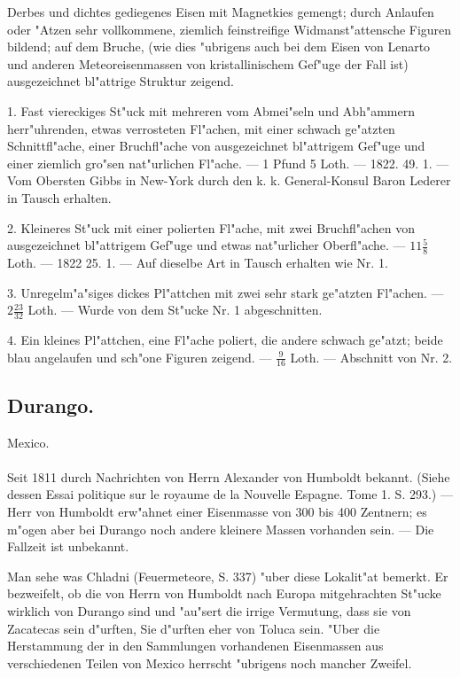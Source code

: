 \documentclass[a4paper, 11pt, oneside, polutonikogreek, german]{article}
\begin{document}
\setlength{\leftskip}{0pt}
\setlength{\parindent}{20pt}

Derbes und dichtes gediegenes Eisen mit Magnetkies gemengt; durch Anlaufen oder "Atzen sehr vollkommene, ziemlich feinstreifige Widmanst"attensche Figuren bildend; auf dem Bruche, (wie dies "ubrigens auch bei dem Eisen von Lenarto und anderen Meteoreisenmassen von kristallinischem Gef"uge der Fall ist) ausgezeichnet bl"attrige Struktur zeigend.

1. Fast viereckiges St"uck mit mehreren vom Abmei"seln und Abh"ammern herr"uhrenden, etwas verrosteten Fl"achen, mit einer schwach ge"atzten Schnittfl"ache, einer Bruchfl"ache von ausgezeichnet bl"attrigem Gef"uge und einer ziemlich gro"sen nat"urlichen Fl"ache. --- 1 Pfund 5 Loth. --- 1822. 49. 1. --- Vom Obersten Gibbs in New-York durch den k. k. General-Konsul Baron Lederer in Tausch erhalten.

2. Kleineres St"uck mit einer polierten Fl"ache, mit zwei Bruchfl"achen von ausgezeichnet bl"attrigem Gef"uge und etwas nat"urlicher Oberfl"ache. --- $11\frac{5}{8}$ Loth. --- 1822 25. 1. --- Auf dieselbe Art in Tausch erhalten wie Nr. 1.

3. Unregelm"a"siges dickes Pl"attchen mit zwei sehr stark ge"atzten Fl"achen. --- $2\frac{23}{32}$ Loth. --- Wurde von dem St"ucke Nr. 1 abgeschnitten.

4. Ein kleines Pl"attchen, eine Fl"ache poliert, die andere schwach ge"atzt; beide blau angelaufen und sch"one Figuren zeigend. --- $\frac{9}{16}$ Loth. --- Abschnitt von Nr. 2.
\subsection{Durango.}
\begin{center}
\small
Mexico.
\end{center}
\paragraph{}
Seit 1811 durch Nachrichten von Herrn Alexander von Humboldt bekannt. (Siehe dessen Essai politique sur le royaume de la Nouvelle Espagne. Tome 1. S. 293.) --- Herr von Humboldt erw"ahnet einer Eisenmasse von 300 bis 400 Zentnern; es m"ogen aber bei Durango noch andere kleinere Massen vorhanden sein. --- Die Fallzeit ist unbekannt.

\setlength{\leftskip}{10mm}
\setlength{\parindent}{0pt}

{\footnotesize Man sehe was Chladni (Feuermeteore, S. 337) "uber diese Lokalit"at bemerkt. Er bezweifelt, ob die von Herrn von Humboldt nach Europa mitgehrachten St"ucke wirklich von Durango sind und "au"sert die irrige Vermutung, dass sie von Zacatecas sein d"urften, Sie d"urften eher von Toluca sein. "Uber die Herstammung der in den Sammlungen vorhandenen Eisenmassen aus verschiedenen Teilen von Mexico herrscht "ubrigens noch mancher Zweifel.}
\end{document}
